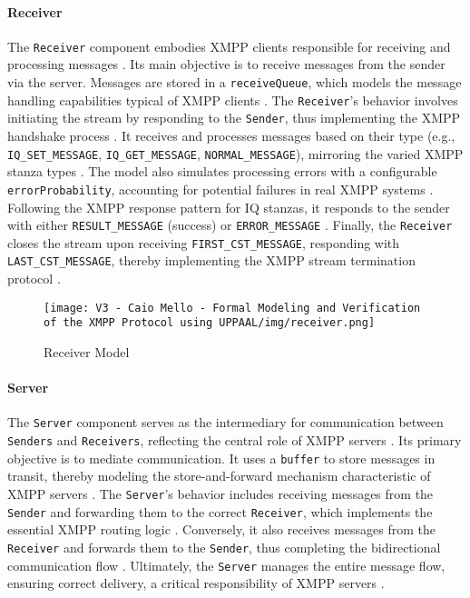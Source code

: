 \paragraph{Receiver}
The \texttt{Receiver} component embodies XMPP clients responsible for receiving and processing messages \cite{meijer2005jabber}. Its main objective is to receive messages from the sender via the server. Messages are stored in a \texttt{receiveQueue}, which models the message handling capabilities typical of XMPP clients \cite{adams2002xep}. The \texttt{Receiver}'s behavior involves initiating the stream by responding to the \texttt{Sender}, thus implementing the XMPP handshake process \cite{rfc6120}. It receives and processes messages based on their type (e.g., \texttt{IQ\_SET\_MESSAGE}, \texttt{IQ\_GET\_MESSAGE}, \texttt{NORMAL\_MESSAGE}), mirroring the varied XMPP stanza types \cite{smith2009xmpp}. The model also simulates processing errors with a configurable \texttt{errorProbability}, accounting for potential failures in real XMPP systems \cite{waher2015learning}. Following the XMPP response pattern for IQ stanzas, it responds to the sender with either \texttt{RESULT\_MESSAGE} (success) or \texttt{ERROR\_MESSAGE} \cite{rfc6120}. Finally, the \texttt{Receiver} closes the stream upon receiving \texttt{FIRST\_CST\_MESSAGE}, responding with \texttt{LAST\_CST\_MESSAGE}, thereby implementing the XMPP stream termination protocol \cite{meijer2005jabber}.

\begin{figure}[h]
 \centering
 \texttt{[image: V3 - Caio Mello - Formal Modeling and Verification of the XMPP Protocol using UPPAAL/img/receiver.png]} 
 \caption{Receiver Model}
 \label{fig:receiver}
\end{figure}

\paragraph{Server}
The \texttt{Server} component serves as the intermediary for communication between \texttt{Senders} and \texttt{Receivers}, reflecting the central role of XMPP servers \cite{meijer2005jabber}. Its primary objective is to mediate communication. It uses a \texttt{buffer} to store messages in transit, thereby modeling the store-and-forward mechanism characteristic of XMPP servers \cite{smith2009xmpp}. The \texttt{Server}'s behavior includes receiving messages from the \texttt{Sender} and forwarding them to the correct \texttt{Receiver}, which implements the essential XMPP routing logic \cite{rfc6120}. Conversely, it also receives messages from the \texttt{Receiver} and forwards them to the \texttt{Sender}, thus completing the bidirectional communication flow \cite{meijer2005jabber}. Ultimately, the \texttt{Server} manages the entire message flow, ensuring correct delivery, a critical responsibility of XMPP servers \cite{waher2015learning}.

